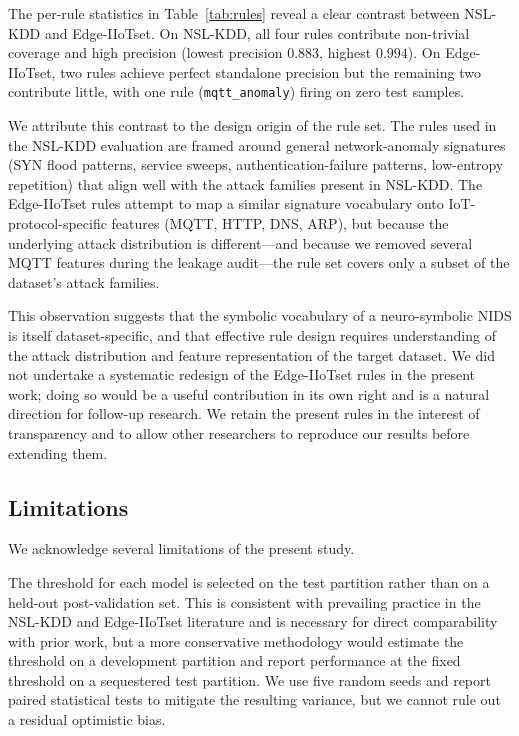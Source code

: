 \documentclass[pdflatex,sn-mathphys-num]{sn-jnl}
\theoremstyle{thmstyleone}
\theoremstyle{thmstyletwo}
\theoremstyle{thmstylethree}
\begin{document}
The per-rule statistics in Table~\ref{tab:rules} reveal a clear contrast between NSL-KDD and Edge-IIoTset. On NSL-KDD, all four rules contribute non-trivial coverage and high precision (lowest precision $0.883$, highest $0.994$). On Edge-IIoTset, two rules achieve perfect standalone precision but the remaining two contribute little, with one rule (\texttt{mqtt\_anomaly}) firing on zero test samples.

We attribute this contrast to the design origin of the rule set. The rules used in the NSL-KDD evaluation are framed around general network-anomaly signatures (SYN flood patterns, service sweeps, authentication-failure patterns, low-entropy repetition) that align well with the attack families present in NSL-KDD. The Edge-IIoTset rules attempt to map a similar signature vocabulary onto IoT-protocol-specific features (MQTT, HTTP, DNS, ARP), but because the underlying attack distribution is different---and because we removed several MQTT features during the leakage audit---the rule set covers only a subset of the dataset's attack families.

This observation suggests that the symbolic vocabulary of a neuro-symbolic NIDS is itself dataset-specific, and that effective rule design requires understanding of the attack distribution and feature representation of the target dataset. We did not undertake a systematic redesign of the Edge-IIoTset rules in the present work; doing so would be a useful contribution in its own right and is a natural direction for follow-up research. We retain the present rules in the interest of transparency and to allow other researchers to reproduce our results before extending them.

\subsection{Limitations}\label{sec:disc-limitations}

We acknowledge several limitations of the present study.

The threshold for each model is selected on the test partition rather than on a held-out post-validation set. This is consistent with prevailing practice in the NSL-KDD and Edge-IIoTset literature and is necessary for direct comparability with prior work, but a more conservative methodology would estimate the threshold on a development partition and report performance at the fixed threshold on a sequestered test partition. We use five random seeds and report paired statistical tests to mitigate the resulting variance, but we cannot rule out a residual optimistic bias.
\end{document}
